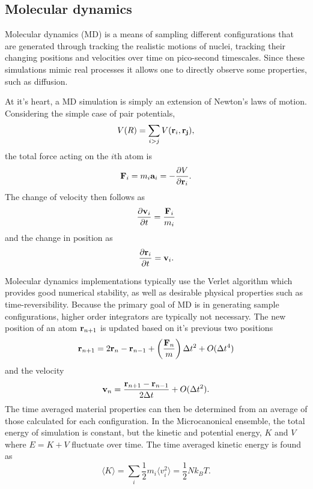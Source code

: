 \subsection{Molecular dynamics}

Molecular dynamics (MD) is a means of sampling different configurations that are
generated through tracking the realistic motions of nuclei, tracking their changing
positions and velocities over time on pico-second timescales. Since these simulations
mimic real processes it allows one to directly observe some properties, such as
diffusion.

At it's heart, a MD simulation is simply an extension of Newton's laws of motion. Considering the
simple case of pair potentials, 
%
\begin{equation}
    V(R) = \sum_{i>j} V({\bf r}_i,{\bf r_j}),
\end{equation}
%
the total force acting on the $i$th atom is
%
\begin{equation}
    {\bf F}_i = m_i{\bf a}_i = - \frac{\partial V}{\partial {\bf r}_i}.
\end{equation}
%
The change of velocity then follows as 
%
\begin{equation}
    \frac{\partial {\bf v}_i}{\partial t} = \frac{ {\bf F}_i}{m_i}
\end{equation}
%
and the change in position as 
%
\begin{equation}
    \frac{\partial {\bf r}_i}{\partial t} = {\bf v}_i.
\end{equation}
%

Molecular dynamics implementations typically use the Verlet algorithm
\citep{Verlet1967} which provides good numerical stability, as well as desirable
physical properties such as time-reversibility. Because the primary goal of MD is in
generating sample configurations, higher order integrators are typically not
necessary. The new position of an atom  ${\bf r}_{n+1}$ is updated based on it's
previous two positions
%
\begin{equation}
    {\bf r}_{n+1} = 2{\bf r}_{n} - {\bf r}_{n-1} + \left(\frac{ {\bf F}_n }{m}
    \right) \Delta t^2 + O(\Delta t^4)
\end{equation}
%
and the velocity
%
\begin{equation}
    {\bf v}_{n} = \frac{{\bf r}_{n+1} - {\bf r}_{n-1}}{2\Delta t}  + O(\Delta t^2).
\end{equation}
%
The time averaged material properties can then be determined from an
average of those calculated for each configuration. In the Microcanonical
ensemble, the total energy of simulation is constant, but the kinetic and potential
energy, $K$ and $V$ where $E=K+V$ fluctuate over time. The time averaged kinetic
energy is found as 
%
\begin{equation}
    \langle K \rangle = \sum_i \frac{1}{2}m_i\langle  v_i^2 \rangle =
    \frac{1}{2}Nk_BT.
\end{equation}

